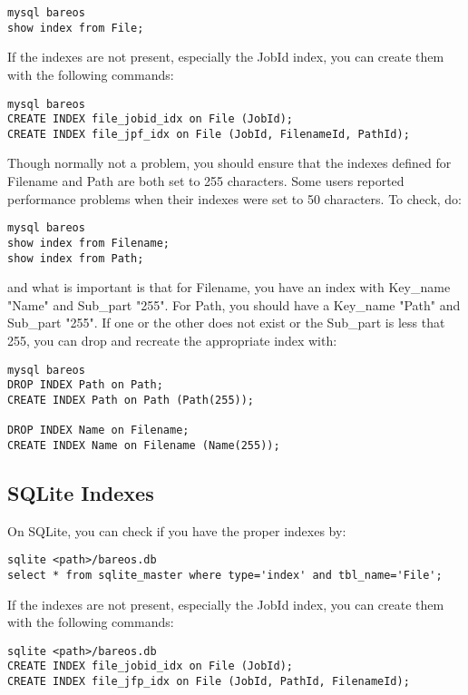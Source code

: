 \footnotesize
\begin{verbatim}
mysql bareos
show index from File;
\end{verbatim}
\normalsize

If the indexes are not present, especially the JobId index, you can
create them with the following commands:

\footnotesize
\begin{verbatim}
mysql bareos
CREATE INDEX file_jobid_idx on File (JobId);
CREATE INDEX file_jpf_idx on File (JobId, FilenameId, PathId);
\end{verbatim}
\normalsize

Though normally not a problem, you should ensure that the indexes
defined for Filename and Path are both set to 255 characters. Some users
reported performance problems when their indexes were set to 50 characters.
To check, do:

\footnotesize
\begin{verbatim}
mysql bareos
show index from Filename;
show index from Path;
\end{verbatim}
\normalsize

and what is important is that for Filename, you have an index with
Key\_name "Name" and Sub\_part "255". For Path, you should have a Key\_name
"Path" and Sub\_part "255".  If one or the other does not exist or the
Sub\_part is less that 255, you can drop and recreate the appropriate
index with:

\footnotesize
\begin{verbatim}
mysql bareos
DROP INDEX Path on Path;
CREATE INDEX Path on Path (Path(255));

DROP INDEX Name on Filename;
CREATE INDEX Name on Filename (Name(255));
\end{verbatim}
\normalsize


\subsection{SQLite Indexes}
On SQLite, you can check if you have the proper indexes by:

\footnotesize
\begin{verbatim}
sqlite <path>/bareos.db
select * from sqlite_master where type='index' and tbl_name='File';
\end{verbatim}
\normalsize

If the indexes are not present, especially the JobId index, you can
create them with the following commands:

\footnotesize
\begin{verbatim}
sqlite <path>/bareos.db
CREATE INDEX file_jobid_idx on File (JobId);
CREATE INDEX file_jfp_idx on File (JobId, PathId, FilenameId);
\end{verbatim}
\normalsize



